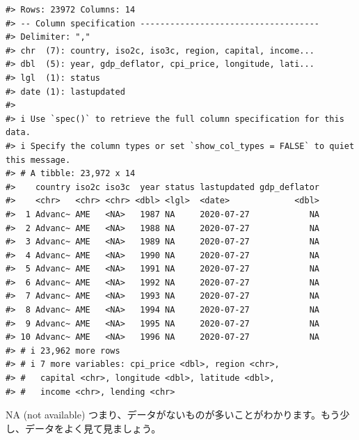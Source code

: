 \documentclass[
  xelatex, ja=standard]{bxjsbook}
\theoremstyle{definition}
\theoremstyle{definition}
\theoremstyle{definition}
\theoremstyle{definition}
\theoremstyle{remark}
\begin{document}
\begin{verbatim}
#> Rows: 23972 Columns: 14
#> -- Column specification ------------------------------------
#> Delimiter: ","
#> chr  (7): country, iso2c, iso3c, region, capital, income...
#> dbl  (5): year, gdp_deflator, cpi_price, longitude, lati...
#> lgl  (1): status
#> date (1): lastupdated
#> 
#> i Use `spec()` to retrieve the full column specification for this data.
#> i Specify the column types or set `show_col_types = FALSE` to quiet this message.
#> # A tibble: 23,972 x 14
#>    country iso2c iso3c  year status lastupdated gdp_deflator
#>    <chr>   <chr> <chr> <dbl> <lgl>  <date>             <dbl>
#>  1 Advanc~ AME   <NA>   1987 NA     2020-07-27            NA
#>  2 Advanc~ AME   <NA>   1988 NA     2020-07-27            NA
#>  3 Advanc~ AME   <NA>   1989 NA     2020-07-27            NA
#>  4 Advanc~ AME   <NA>   1990 NA     2020-07-27            NA
#>  5 Advanc~ AME   <NA>   1991 NA     2020-07-27            NA
#>  6 Advanc~ AME   <NA>   1992 NA     2020-07-27            NA
#>  7 Advanc~ AME   <NA>   1993 NA     2020-07-27            NA
#>  8 Advanc~ AME   <NA>   1994 NA     2020-07-27            NA
#>  9 Advanc~ AME   <NA>   1995 NA     2020-07-27            NA
#> 10 Advanc~ AME   <NA>   1996 NA     2020-07-27            NA
#> # i 23,962 more rows
#> # i 7 more variables: cpi_price <dbl>, region <chr>,
#> #   capital <chr>, longitude <dbl>, latitude <dbl>,
#> #   income <chr>, lending <chr>
\end{verbatim}

NA (not available) つまり、データがないものが多いことがわかります。もう少し、データをよく見て見ましょう。
\end{document}
